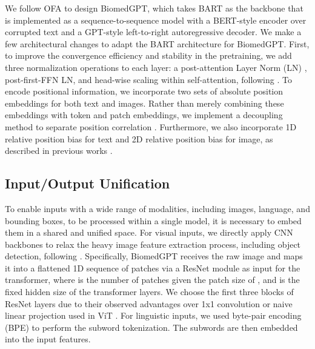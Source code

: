\documentclass[10pt]{article} \usepackage[preprint]{tmlr}
\begin{document}
We follow OFA \citep{wang2022ofa} to design BiomedGPT, which takes BART \citep{lewis2019bart} as the backbone that is implemented as a sequence-to-sequence model with a BERT-style encoder over corrupted text and a GPT-style left-to-right autoregressive decoder. We make a few architectural changes to adapt the BART architecture for BiomedGPT. First, to improve the convergence efficiency and stability in the pretraining, we add three normalization operations to each layer: a post-attention Layer Norm (LN) \citep{ba2016layer}, post-first-FFN LN, and head-wise scaling within self-attention, following \citep{shleifer2021normformer}. To encode positional information, we incorporate two sets of absolute position embeddings for both text and images. Rather than merely combining these embeddings with token and patch embeddings, we implement a decoupling method to separate position correlation \citep{kitaev2018constituency, kerethinking}. Furthermore, we also incorporate 1D relative position bias for text and 2D relative position bias for image, as described in previous works \citep{raffel2020exploring, dai2021coatnet, wangsimvlm}.



\subsection{Input/Output Unification} \label{sec:unified_io}
To enable inputs with a wide range of modalities, including images, language, and bounding boxes, to be processed within a single model, it is necessary to embed them in a shared and unified space. For visual inputs, we directly apply CNN backbones to relax the heavy image feature extraction process, including object detection, following \citep{kim2021vilt}. Specifically, BiomedGPT receives the raw image  and maps it into a flattened 1D sequence of patches  via a ResNet module as input for the transformer, where  is the number of patches given the patch size of , and  is the fixed hidden size of the transformer layers. We choose the first three blocks of ResNet layers due to their observed advantages over 1x1 convolution or naive linear projection used in ViT \citep{wangsimvlm}. For linguistic inputs, we used byte-pair encoding (BPE) \citep{sennrich2016neural} to perform the subword tokenization. The subwords are then embedded into the input features.
\end{document}
